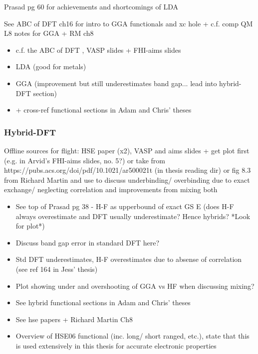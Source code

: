 \documentclass[11pt, twoside]{report}
\begin{document}
Prasad pg 60 for achievements and shortcomings of LDA

See ABC of DFT ch16 for intro to GGA functionals and xc hole + c.f. comp QM L8 notes for GGA + RM ch8



\cite{Prasad_ch3}
\cite{RichardMartin_Ch8}
\cite{ABC_of_DFT}

\begin{itemize}
\item c.f. the ABC of DFT \cite{ABC_of_DFT}, VASP slides + FHI-aims slides
\item LDA (good for metals)
\item GGA (improvement but still underestimates band gap... lead into hybrid-DFT section)
\item + cross-ref functional sections in Adam and Chris' theses
\end{itemize}

\subsubsection{Hybrid-DFT}\label{hse_theory}
Offline sources for flight: HSE paper (x2), VASP and aims slides + get plot first (e.g. in Arvid's FHI-aims slides, no. 5?) or take from https://pubs.acs.org/doi/pdf/10.1021/ar500021t (in thesis reading dir) or fig 8.3 from Richard Martin and use to discuss underbinding/ overbinding due to exact exchange/ neglecting correlation and improvements from mixing both
\begin{itemize}
\item See top of Prasad pg 38 - H-F as upperbound of exact GS E (does H-F always overestimate and DFT usually underestimate? Hence hybrids? *Look for plot*)
\item Discuss band gap error in standard DFT here?
\item Std DFT underestimates, H-F overestimates due to absense of correlation (see ref 164 in Jess' thesis)
\item Plot showing under and overshooting of GGA vs HF when discussing mixing?
\item See hybrid functional sections in Adam and Chris' theses
\item See hse papers + Richard Martin Ch8 \cite{RichardMartin_Ch8}
\item Overview of HSE06 functional (inc. long/ short ranged, etc.), state that this is used extensively in this thesis for accurate electronic properties
\end{itemize}
\end{document}
